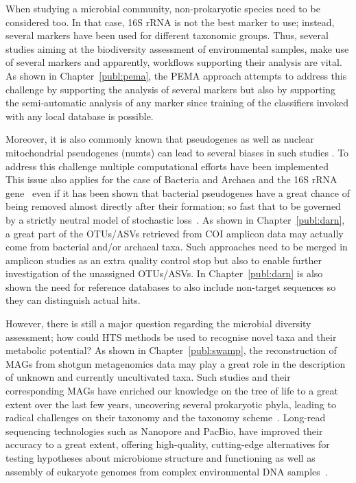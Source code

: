    When studying a microbial community, non-prokaryotic species need to be considered too. 
   In that case, 16S rRNA is not the best marker to use; instead, several markers 
   have been used for different taxonomic groups. 
   Thus, several studies aiming at the biodiversity assessment of environmental samples, 
   make use of several markers and apparently, workflows supporting their analysis are vital. 
   As shown in Chapter~\ref{publ:pema}, the PEMA approach attempts to address this challenge 
   by supporting the analysis of several markers but also by
   supporting the semi-automatic analysis of any marker since training of the classifiers invoked
   with any local database is possible. 

   Moreover, it is also commonly known that pseudogenes as well as 
   nuclear mitochondrial pseudogenes (numts) can lead to several biases in such studies \citep{song2008many}.
   To address this challenge multiple computational efforts have been implemented~\citep{porter2021profile}
   This issue also applies for the case of Bacteria and Archaea and the 16S rRNA gene~\citep{pei2010diversity}
   even if it has been shown that bacterial pseudogenes have a great chance of being removed almost directly after their formation;
   so fast that to be governed by a strictly neutral model of stochastic loss~\citep{kuo2010extinction}.
   As shown in Chapter~\ref{publ:darn}, a great part of the OTUs/ASVs retrieved from COI amplicon data
   may actually come from bacterial and/or archaeal taxa.
   Such approaches need to be merged in amplicon studies as an extra
   quality control stop but also to enable further investigation of the unassigned OTUs/ASVs. 
   In Chapter~\ref{publ:darn} is also shown the need for reference databases to also include non-target sequences 
   so they can distinguish actual hits. 

   However, there is still a major question regarding the microbial diversity assessment; 
   how could HTS methods be used to recognise novel taxa and their metabolic potential? 
   As shown in Chapter~\ref{publ:swamp}, the reconstruction of MAGs from shotgun metagenomics data
   may play a great role in the description of unknown and currently uncultivated taxa. 
   Such studies and their corresponding MAGs have enriched our knowledge on the tree of life to a great extent 
   over the last few years, uncovering several prokaryotic phyla, leading to 
   radical challenges on their taxonomy and the taxonomy scheme~\citep{parks_gtdb_2022}.
   Long-read sequencing technologies such as Nanopore and PacBio, have improved their accuracy to a great extent,
   offering high-quality, cutting-edge alternatives for testing hypotheses about microbiome structure 
   and functioning as well as assembly of eukaryote genomes from complex environmental DNA samples~\citep{tedersoo2021perspectives}.

